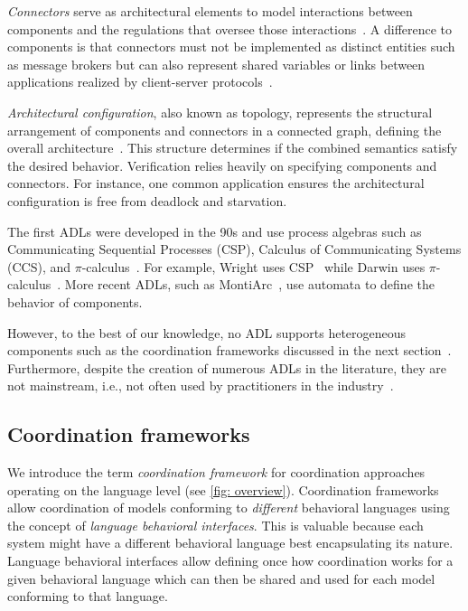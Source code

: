 \documentclass[runningheads]{llncs}
\begin{document}
\textit{Connectors} serve as architectural elements to model interactions between components and the regulations that oversee those interactions~\cite{medvidovicClassificationComparisonFramework2000}.
A difference to components is that connectors must not be implemented as distinct entities such as message brokers but can also represent shared variables or links between applications realized by client-server protocols~\cite{medvidovicClassificationComparisonFramework2000}.

\textit{Architectural configuration}, also known as topology, represents the structural arrangement of components and connectors in a connected graph, defining the overall architecture~\cite{medvidovicClassificationComparisonFramework2000}.
This structure determines if the combined semantics satisfy the desired behavior.
Verification relies heavily on specifying components and connectors.
For instance, one common application ensures the architectural configuration is free from deadlock and starvation.

The first ADLs were developed in the 90s and use process algebras such as Communicating Sequential Processes (CSP), Calculus of Communicating Systems (CCS), and $\pi$-calculus~\cite{ozkayaAreWeThere2013}.
For example, Wright uses CSP~\cite{allenFormalBasisArchitectural1997} while Darwin uses $\pi$-calculus~\cite{mageeSpecifyingDistributedSoftware1995}.
More recent ADLs, such as MontiArc~\cite{haberMontiArcArchitecturalModeling2014}, use automata to define the behavior of components.

However, to the best of our knowledge, no ADL supports heterogeneous components such as the coordination frameworks discussed in the next section~\cite{medvidovicClassificationComparisonFramework2000}.
Furthermore, despite the creation of numerous ADLs in the literature, they are not mainstream, i.e., not often used by practitioners in the industry~\cite{clementsSurveyArchitectureDescription1996,woodsArchitectureDescriptionLanguages2005,pandeyArchitecturalDescriptionLanguages2010,ozkayaAreWeThere2013,medvidovicMovingArchitecturalDescription2006}.

\subsection{Coordination frameworks} \label{subsec: frameworks}
We introduce the term \textit{coordination framework} for coordination approaches operating on the language level (see \autoref{fig: overview}).
Coordination frameworks allow coordination of models conforming to \textit{different} behavioral languages using the concept of \textit{language behavioral interfaces}.
This is valuable because each system might have a different behavioral language best encapsulating its nature.
Language behavioral interfaces allow defining once how coordination works for a given behavioral language which can then be shared and used for each model conforming to that language.
\end{document}
